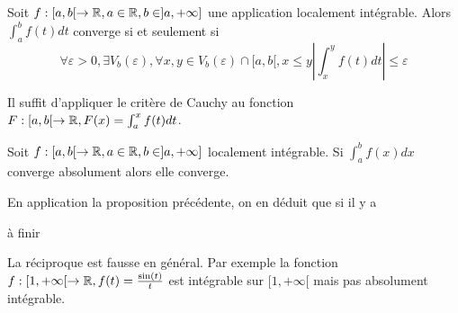 \documentclass[a4paper, 12pt]{article}
\begin{document}
\begin{proposition}{}{}
    Soit $f: [a, b[ \to \mathbb{R}, a \in \mathbb{R}, b \in ]a, +\infty]$ une application localement intégrable. Alors $\int_a^bf(t)dt$ converge
    si et seulement si
    $$
    \forall \varepsilon > 0, \exists V_b(\varepsilon), \forall x, y \in V_b(\varepsilon) \cap [a, b[, x \leq y |\int_x^yf(t)dt| \leq \varepsilon
    $$
\end{proposition}

\begin{demonstration}
    Il suffit d'appliquer le critère de Cauchy au fonction $F: [a, b[ \to \mathbb{R}, F(x) = \int_a^xf(t)dt$.
\end{demonstration}

\begin{proposition}{}{}
    Soit $f: [a, b[ \to \mathbb{R}, a \in \mathbb{R}, b \in ]a, +\infty]$ localement intégrable. Si $\int_a^bf(x)dx$ converge absolument alors elle converge.
\end{proposition}

\begin{demonstration}
    En application la proposition précédente, on en déduit que si il y a 
    \begin{hotwarn}
    à finir
    \end{hotwarn}
\end{demonstration}

\begin{remarque}
    La réciproque est fausse en général. Par exemple la fonction $f: [1, +\infty[ \to \mathbb{R}, f(t) = \frac{\sin(t)}{t}$
    est intégrable sur $[1, +\infty[$ mais pas absolument intégrable.
\end{remarque}
\end{document}
